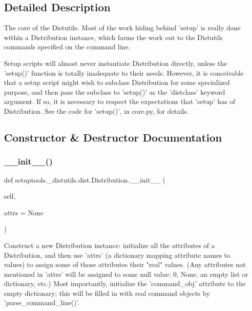 \subsection{Detailed Description}
\begin{DoxyVerb}The core of the Distutils.  Most of the work hiding behind 'setup'
is really done within a Distribution instance, which farms the work out
to the Distutils commands specified on the command line.

Setup scripts will almost never instantiate Distribution directly,
unless the 'setup()' function is totally inadequate to their needs.
However, it is conceivable that a setup script might wish to subclass
Distribution for some specialized purpose, and then pass the subclass
to 'setup()' as the 'distclass' keyword argument.  If so, it is
necessary to respect the expectations that 'setup' has of Distribution.
See the code for 'setup()', in core.py, for details.
\end{DoxyVerb}
 

\subsection{Constructor \& Destructor Documentation}
\mbox{\label{classsetuptools_1_1__distutils_1_1dist_1_1Distribution_a0094099b63f82cdff60b30ef26b1c9b0}} 
\subsubsection{\texorpdfstring{\+\_\+\+\_\+init\+\_\+\+\_\+()}{\_\_init\_\_()}}
{\footnotesize\ttfamily def setuptools.\+\_\+distutils.\+dist.\+Distribution.\+\_\+\+\_\+init\+\_\+\+\_\+ (\begin{DoxyParamCaption}\item[{}]{self,  }\item[{}]{attrs = {\ttfamily None} }\end{DoxyParamCaption})}

\begin{DoxyVerb}Construct a new Distribution instance: initialize all the
attributes of a Distribution, and then use 'attrs' (a dictionary
mapping attribute names to values) to assign some of those
attributes their "real" values.  (Any attributes not mentioned in
'attrs' will be assigned to some null value: 0, None, an empty list
or dictionary, etc.)  Most importantly, initialize the
'command_obj' attribute to the empty dictionary; this will be
filled in with real command objects by 'parse_command_line()'.
\end{DoxyVerb}
 

